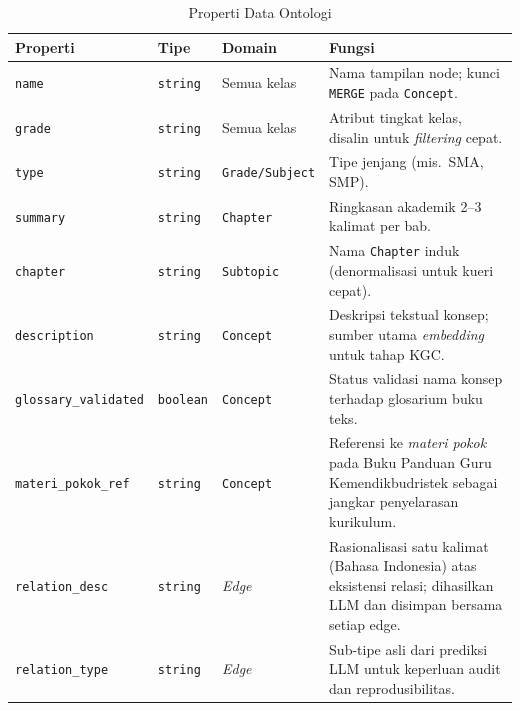 \documentclass[../../thesis]{subfiles}
\begin{document}
\begin{table}[htbp]
  \centering
  \renewcommand{\arraystretch}{1.3}
  \caption{Properti Data Ontologi}
  \label{tab:data-properties}
  \begin{tabularx}{\textwidth}{@{}lll X@{}}
    \toprule
    \textbf{Properti} & \textbf{Tipe} & \textbf{Domain} & \textbf{Fungsi} \\
    \midrule
    \texttt{name}
      & \texttt{string} & Semua kelas
      & Nama tampilan node; kunci \texttt{MERGE} pada \texttt{Concept}. \\
    \texttt{grade}
      & \texttt{string} & Semua kelas
      & Atribut tingkat kelas, disalin untuk \textit{filtering} cepat. \\
    \texttt{type}
      & \texttt{string} & \texttt{Grade/Subject}
      & Tipe jenjang (mis.\ SMA, SMP). \\
    \texttt{summary}
      & \texttt{string} & \texttt{Chapter}
      & Ringkasan akademik 2--3 kalimat per bab. \\
    \texttt{chapter}
      & \texttt{string} & \texttt{Subtopic}
      & Nama \texttt{Chapter} induk (denormalisasi untuk kueri cepat). \\
    \texttt{description}
      & \texttt{string} & \texttt{Concept}
      & Deskripsi tekstual konsep; sumber utama \textit{embedding}
        untuk tahap KGC. \\
    \texttt{glossary\_validated}
      & \texttt{boolean} & \texttt{Concept}
      & Status validasi nama konsep terhadap glosarium buku teks. \\
    \texttt{materi\_pokok\_ref}
      & \texttt{string} & \texttt{Concept}
      & Referensi ke \textit{materi pokok} pada Buku Panduan Guru
        Kemendikbudristek sebagai jangkar penyelarasan kurikulum. \\
    \midrule
    \texttt{relation\_desc}
      & \texttt{string} & \textit{Edge}
      & Rasionalisasi satu kalimat (Bahasa Indonesia) atas eksistensi
        relasi; dihasilkan LLM dan disimpan bersama setiap edge. \\
    \texttt{relation\_type}
      & \texttt{string} & \textit{Edge}
      & Sub-tipe asli dari prediksi LLM untuk keperluan audit dan
        reprodusibilitas. \\
    \bottomrule
  \end{tabularx}
\end{table}
\end{document}

